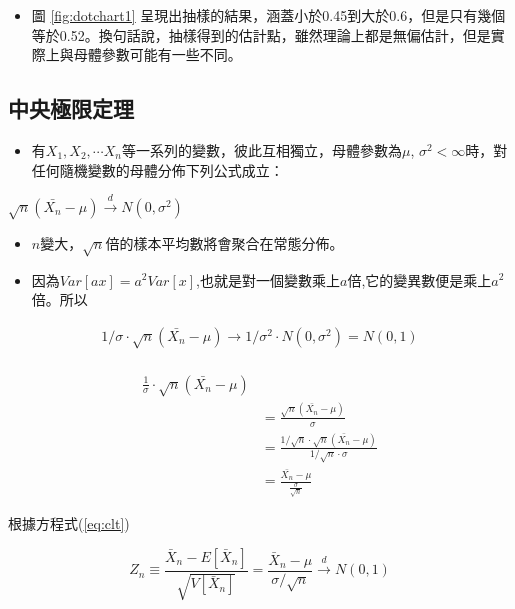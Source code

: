 \documentclass[hyperref,]{ctexart}
\providecommand{\tightlist}{%
  \setlength{\itemsep}{0pt}\setlength{\parskip}{0pt}}
\begin{document}
\begin{itemize}
\tightlist
\item
  圖 \ref{fig:dotchart1}
  呈現出抽樣的結果，涵蓋小於0.45到大於0.6，但是只有幾個等於0.52。換句話說，抽樣得到的估計點，雖然理論上都是無偏估計，但是實際上與母體參數可能有一些不同。
\end{itemize}

\hypertarget{ux4e2dux592eux6975ux9650ux5b9aux7406}{%
\subsection{中央極限定理}\label{ux4e2dux592eux6975ux9650ux5b9aux7406}}

\begin{itemize}
\tightlist
\item
  有\(X_{1}, X_{2},\cdots X_{n}\)等一系列的變數，彼此互相獨立，母體參數為\(\mu\),
  \(\sigma^2<\infty\)時，對任何隨機變數的母體分佈下列公式成立：
\end{itemize}

\begin{center}
$\sqrt{n}(\bar{X_{n}}-\mu)\xrightarrow{d} N(0, \sigma^2)$
\end{center}

\begin{itemize}
\tightlist
\item
  \(n\)變大，\(\sqrt{n}\)倍的樣本平均數將會聚合在常態分佈。
\item
  因為\(Var[ax]=a^2Var[x]\),也就是對一個變數乘上\(a\)倍,它的變異數便是乘上\(a^2\)倍。所以
\end{itemize}

\begin{align*}
1/\sigma \cdot \sqrt{n}(\bar{X_{n}}-\mu)  \rightarrow 1/\sigma^2\cdot N(0, \sigma^2)=N(0,1)\\
\end{align*}

\begin{align}
\frac{1}{\sigma}\cdot \sqrt{n}(\bar{X_{n}}-\mu)\nonumber \\
& = \frac{\sqrt{n}(\bar{X_{n}}-\mu)}{\sigma}\nonumber \\
& = \frac{1/\sqrt{n}\cdot \sqrt{n}(\bar{X_{n}}-\mu)}{1/\sqrt{n}\cdot \sigma}\nonumber  \\
& =\frac{\bar{X_{n}}-\mu}{\frac{\sigma}{\sqrt{n}}}\label{eq:clt}
\end{align}

根據方程式(\ref{eq:clt})

\[Z_{n}\equiv \frac{\bar{X}_{n}-E[\bar{X}_{n}]}{\sqrt{V[\bar{X}_{n}]}}=\frac{\bar{X}_{n}-\mu}{\sigma/\sqrt{n}}\xrightarrow{d}{\mathit N}(0,1)\]
\end{document}
